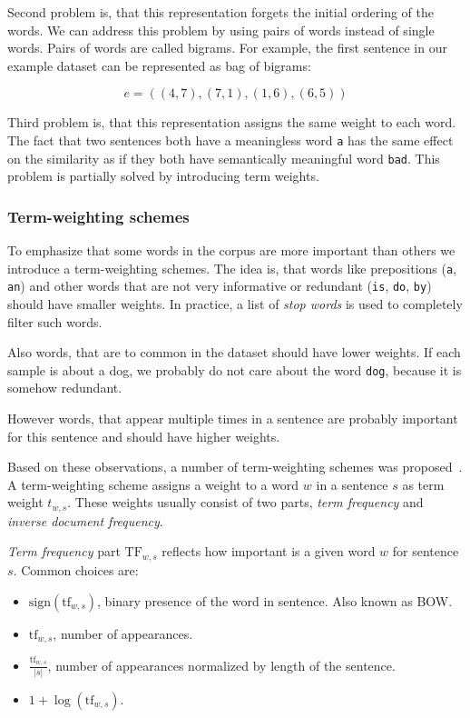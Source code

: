     Second problem is, that this representation forgets the initial ordering of the words.
    We can address this problem by using pairs of words instead of single words. 
    Pairs of words are called bigrams.
    For example, the first sentence in our example dataset can be represented as bag of bigrams:
    
    $$e = ((4,7),(7,1),(1,6),(6,5))$$
    
    Third problem is, that this representation assigns the same weight to each word.
    The fact that two sentences both have a meaningless word \texttt{a} has the same effect on the similarity as if they both have semantically meaningful word \texttt{bad}. 
    This problem is partially solved by introducing term weights.
    
    
    \subsubsection{Term-weighting schemes} \label{sec:term:weights}
    
    To emphasize that some words in the corpus are more important than others we introduce a term-weighting schemes. 
    The idea is, that words like prepositions (\texttt{a}, \texttt{an}) and other words that are not very informative or redundant (\texttt{is}, \texttt{do}, \texttt{by}) should have smaller weights. 
    In practice, a list of \textit{stop words} is used to completely filter such words.
    
    Also words, that are to common in the dataset should have lower weights.
    If each sample is about a dog, we probably do not care about the word \texttt{dog}, because it is somehow redundant.
    
    However words, that appear multiple times in a sentence are probably important for this sentence and should have higher weights.
    
    Based on these observations, a number of term-weighting schemes was proposed~\cite{salton1988term}.
    A term-weighting scheme assigns a weight to a word $w$ in a sentence $s$ as term weight $t_{w,s}$.
    These weights usually consist of two parts, \emph{term frequency} and \emph{inverse document frequency}. 
    
    \emph{Term frequency} part $\mathrm{TF}_{w,s}$ reflects how important is a given word $w$ for sentence $s$.
    Common choices are:
    \begin{itemize}
        \item $\mathrm{sign}(\mathrm{tf}_{w,s})$, binary presence of the word in sentence. Also known as BOW.
        \item $\mathrm{tf}_{w,s}$, number of appearances.
        \item $\frac{\mathrm{tf}_{w,s}}{|s|}$, number of appearances normalized by length of the sentence.
        \item $1+\log(\mathrm{tf}_{w,s})$.
    \end{itemize}
    
